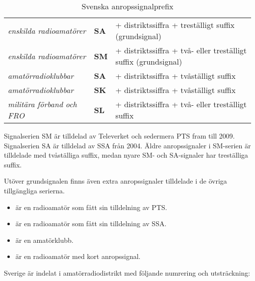 \begin{table*}[ht]
  \begin{center}
    \begin{tabular}{lll}
      \emph{enskilda radioamatörer} & \textbf{SA} &
      + distriktssiffra + treställigt suffix (grundsignal) \\
      \emph{enskilda radioamatörer} & \textbf{SM} &
      + distriktssiffra + två- eller treställigt suffix (grundsignal) \\
      \emph{amatörradioklubbar} & \textbf{SA} &
      + distriktssiffra + tvåställigt suffix \\
      \emph{amatörradioklubbar} & \textbf{SK} &
      + distriktssiffra + tvåställigt suffix \\
      \emph{militära förband och FRO} & \textbf{SL} &
      + distriktssiffra + två- eller treställigt suffix \\
    \end{tabular}
    \caption{Svenska anropssignalprefix}
    \label{tab:seprefix}
  \end{center}
\end{table*}

Signalserien SM är tilldelad av Televerket och sedermera PTS fram till 2009.
Signalserien SA är tilldelad av SSA från 2004.
Äldre anropssignaler i SM-serien är tilldelade med tvåställiga suffix, medan
nyare SM- och SA-signaler har treställiga suffix.

Utöver grundsignalen finns även extra anropssignaler tilldelade i de övriga
tillgängliga serierna.

\begin{tcolorbox}[title=Exempel]
	\begin{itemize}
		\item {} är en radioamatör som fått sin tilldelning av PTS.
		\item {} är en radioamatör som fått sin tilldelning av SSA.
		\item {} är en amatörklubb.
		\item {} är en radioamatör med kort anropssignal.
	\end{itemize}
\end{tcolorbox}

\medskip

Sverige är indelat i amatörradiodistrikt med följande numrering och
utsträckning:

